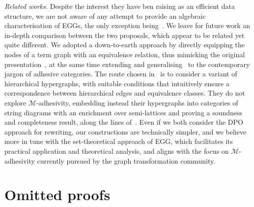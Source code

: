 \documentclass[3p]{elsarticle}
\theoremstyle{remark}
\theoremstyle{definition}
\begin{document}
\emph{Related works.}
Despite the interest they have ben raising as an efficient data structure, we are not aware of any attempt to provide an 
algebraic characterisation of EGGs, the only exception being~\cite{ghica}. We leave for future work an in-depth comparison 
between the two proposals, which appear to be related yet quite different. 
%
%
We adopted a down-to-earth approach by directly equipping
the nodes of a term graph with an equivalence relation, thus mimicking the original presentation~\cite{DetlefsNS05},
at the same time extending and generalising~\cite{concur2006} to the contemporary jargon of adhesive categories. 
The route chosen in~\cite{ghica} is to consider a variant of hierarchical hypergraphs, with suitable conditions that 
intuitively ensure a correspondence between hierarchical edges and equivalence classes. They do not explore
$\mathcal{M}$-adhesivity, embedding instead their hypergraphs into categories of string diagrams with an enrichment 
over semi-lattices and proving a soundness and  completeness result, along the lines of~\cite{bonchi2022string}.
Even if we both consider the DPO approach for rewriting, our constructions are technically simpler, and we believe
more in tune with the set-theoretical approach of EGG, which facilitates its practical application 
and theoretical analysis, and aligns with the focus on $\mathcal{M}$-adhesivity
currently pursued by the graph transformation community.





\appendix
\renewcommand{\thesection}{\Alph{section}}
\section{Omitted proofs}
\end{document}
